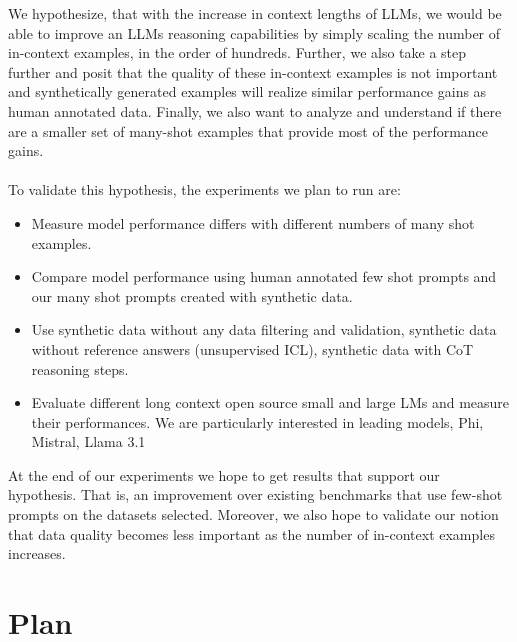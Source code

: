 \documentclass{article}
\begin{document}

We hypothesize, that with the increase in context lengths of LLMs, we would be able to improve an LLMs reasoning capabilities by simply scaling the number of in-context examples, in the order of hundreds. Further, we also take a step further and posit that the quality of these in-context examples is not important and synthetically generated examples will realize similar performance gains as human annotated data. Finally, we also want to analyze and understand if there are a smaller set of many-shot examples that provide most of the performance gains.\\
\\
To validate this hypothesis, the experiments we plan to run are:
\begin{itemize}
    \item Measure model performance differs with different numbers of many shot examples.
    \item Compare model performance using human annotated few shot prompts and our many shot prompts created with synthetic data.
    \item Use synthetic data without any data filtering and validation, synthetic data without reference answers (unsupervised ICL), synthetic data with CoT reasoning steps.
    \item Evaluate different long context open source small and large LMs and measure their performances. We are particularly interested in leading models, Phi, Mistral, Llama 3.1
\end{itemize}
\noindent
At the end of our experiments we hope to get results that support our hypothesis. That is, an improvement over existing benchmarks that use few-shot prompts on the datasets selected. Moreover, we also hope to validate our notion that data quality becomes less important as the number of in-context examples increases.

\section{Plan}
\end{document}
